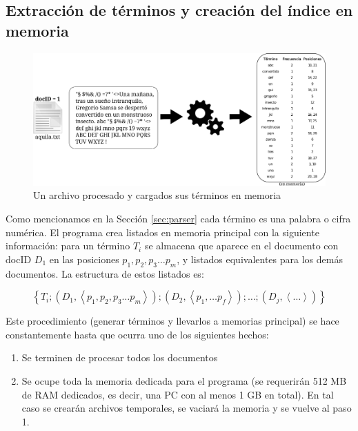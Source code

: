 
\subsection{Extracción de términos y creación del índice en memoria}

\begin{figure}[!h]
\centering
    \includegraphics[scale=0.9]{./Images/parseoYMem.png}
\caption{Un archivo procesado y cargados sus términos en memoria}
\label{fig:parseoymem}
\end{figure}

Como mencionamos en la Sección \ref{sec:parser} cada término es una palabra o cifra numérica. El programa crea listados en memoria principal con la siguiente información: para un término $T_i$ se almacena que aparece en el documento con docID $D_1$ en las posiciones $p_1, p_2, p_3 \ldots p_m$, y listados equivalentes para los demás documentos. La estructura de estos listados es:

\[
\left\lbrace T_i ;
    \left( D_1 , 
        \left\langle
            p_1, p_2, p_3 \ldots p_m 
        \right\rangle  
    \right)
    ;
    \left( D_2 , 
        \left\langle
            p_1, \ldots p_f
        \right\rangle  
    \right) 
    ;
    \ldots
    ;
    \left( D_j , 
        \left\langle
            \dots
        \right\rangle  
    \right) 
\right\rbrace 
\]

Este procedimiento (generar términos y llevarlos a memorias principal) se hace constantemente hasta que ocurra uno de los siguientes hechos:

\begin{enumerate}
\item Se terminen de procesar todos los documentos
\item Se ocupe toda la memoria dedicada para el programa (se requerirán 512 MB de RAM dedicados, es decir, una PC con al menos 1 GB en total). En tal caso se crearán archivos temporales, se vaciará la memoria y se vuelve al paso 1.
\end{enumerate}


